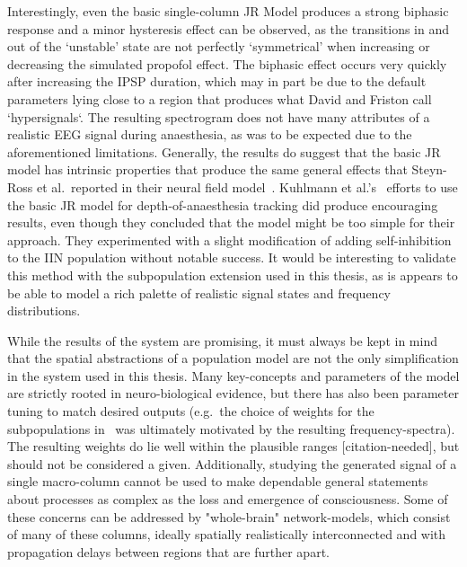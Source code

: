 Interestingly, even the basic single-column JR Model produces a strong biphasic response and a minor hysteresis effect
can be observed, as the transitions in and out of the `unstable' state are not perfectly `symmetrical' when
increasing or decreasing the simulated propofol effect.
The biphasic effect occurs very quickly after increasing the IPSP duration, which may in part be due to the default
parameters lying close to a region that produces what David and Friston call `hypersignals`.
The resulting spectrogram does not have many attributes of a realistic EEG signal during anaesthesia,
as was to be expected due to the aforementioned limitations.
Generally, the results do suggest that the basic JR model has intrinsic properties that produce the same general
effects that Steyn-Ross et al.\ reported in their neural field model~\cite{hutt_progress_2011}.
Kuhlmann et al.'s~\cite{kuhlmann_neural_2016} efforts to use the basic JR model for depth-of-anaesthesia tracking did
produce encouraging results,
even though they concluded that the model might be too simple for their approach.
They experimented with a slight modification of adding self-inhibition to the IIN population without notable success.
It would be interesting to validate this method with the subpopulation extension used in this thesis,
as is appears to be able to model a rich palette of realistic signal states and frequency distributions.


While the results of the system are promising, it must always be kept in mind that the spatial abstractions of a
population model are not the only simplification in the system used in this thesis.
Many key-concepts and parameters of the model are strictly rooted in neuro-biological evidence,
but there has also been parameter tuning to match desired outputs (e.g.\ the choice of weights for the subpopulations
in~\cite{david_neural_2003} was ultimately motivated by the resulting frequency-spectra).
The resulting weights do lie well within the plausible ranges [citation-needed],
but should not be considered a given.
Additionally, studying the generated signal of a single macro-column cannot be used to make dependable
general statements about processes as complex as the loss and emergence of consciousness.
Some of these concerns can be addressed by "whole-brain" network-models,
which consist of many of these columns, ideally spatially realistically interconnected and with propagation delays
between regions that are further apart.


